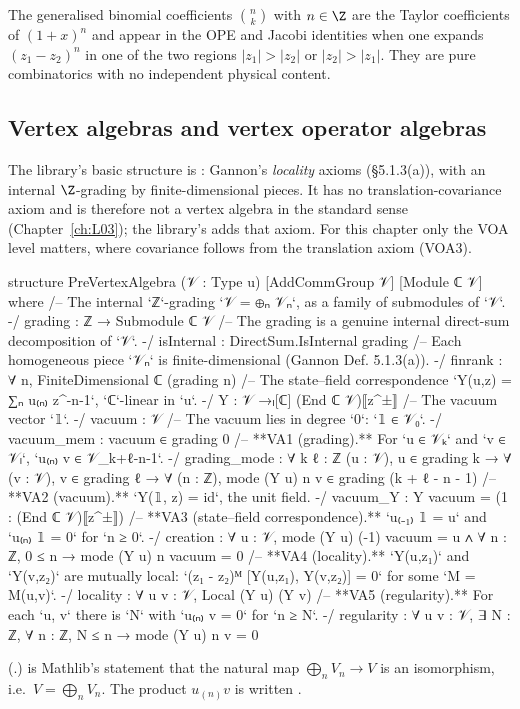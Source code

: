 \begin{physics}
The generalised binomial coefficients $\binom nk$ with $n\in\Z$ are the Taylor coefficients of $(1+x)^n$ and appear in the OPE and Jacobi identities when one expands $(z_1-z_2)^n$ in one of the two regions $|z_1|>|z_2|$ or $|z_2|>|z_1|$. They are pure combinatorics with no independent physical content.
\end{physics}

\subsection{Vertex algebras and vertex operator algebras}

The library's basic structure is : Gannon's \emph{locality} axioms (§5.1.3(a)), with an
internal $\Z$-grading by finite-dimensional pieces. It has no translation-covariance axiom and is therefore not a vertex
algebra in the standard sense (Chapter~\ref{ch:L03}); the library's  adds that axiom. For this
chapter only the VOA level matters, where covariance follows from the translation axiom (VOA3).

\begin{leancode}
structure PreVertexAlgebra (𝒱 : Type u) [AddCommGroup 𝒱] [Module ℂ 𝒱] where
  /-- The internal `ℤ`-grading `𝒱 = ⊕ₙ 𝒱ₙ`, as a family of submodules of `𝒱`. -/
  grading : ℤ → Submodule ℂ 𝒱
  /-- The grading is a genuine internal direct-sum decomposition of `𝒱`. -/
  isInternal : DirectSum.IsInternal grading
  /-- Each homogeneous piece `𝒱ₙ` is finite-dimensional (Gannon Def. 5.1.3(a)). -/
  finrank : ∀ n, FiniteDimensional ℂ (grading n)
  /-- The state–field correspondence `Y(u,z) = ∑ₙ u₍ₙ₎ z^{-n-1}`, `ℂ`-linear in `u`. -/
  Y : 𝒱 →ₗ[ℂ] (End ℂ 𝒱)⟦z^±⟧
  /-- The vacuum vector `𝟙`. -/
  vacuum : 𝒱
  /-- The vacuum lies in degree `0`: `𝟙 ∈ 𝒱₀`. -/
  vacuum_mem : vacuum ∈ grading 0
  /-- **VA1 (grading).** For `u ∈ 𝒱ₖ` and `v ∈ 𝒱ₗ`, `u₍ₙ₎ v ∈ 𝒱_{k+ℓ-n-1}`. -/
  grading_mode : ∀ {k ℓ : ℤ} (u : 𝒱), u ∈ grading k → ∀ (v : 𝒱), v ∈ grading ℓ →
    ∀ (n : ℤ), mode (Y u) n v ∈ grading (k + ℓ - n - 1)
  /-- **VA2 (vacuum).** `Y(𝟙, z) = id`, the unit field. -/
  vacuum_Y : Y vacuum = (1 : (End ℂ 𝒱)⟦z^±⟧)
  /-- **VA3 (state–field correspondence).** `u₍₋₁₎ 𝟙 = u` and `u₍ₙ₎ 𝟙 = 0` for `n ≥ 0`. -/
  creation : ∀ u : 𝒱, mode (Y u) (-1) vacuum = u ∧ ∀ n : ℤ, 0 ≤ n → mode (Y u) n vacuum = 0
  /-- **VA4 (locality).** `Y(u,z₁)` and `Y(v,z₂)` are mutually local:
  `(z₁ - z₂)ᴹ [Y(u,z₁), Y(v,z₂)] = 0` for some `M = M(u,v)`. -/
  locality : ∀ u v : 𝒱, Local (Y u) (Y v)
  /-- **VA5 (regularity).** For each `u, v` there is `N` with `u₍ₙ₎ v = 0` for `n ≥ N`. -/
  regularity : ∀ u v : 𝒱, ∃ N : ℤ, ∀ n : ℤ, N ≤ n → mode (Y u) n v = 0
\end{leancode}
(.)   is Mathlib's
statement that the natural map $\bigoplus_n V_n\to V$ is an isomorphism, i.e.\ $V=\bigoplus_nV_n$.
The product $u_{(n)}v$ is written .

